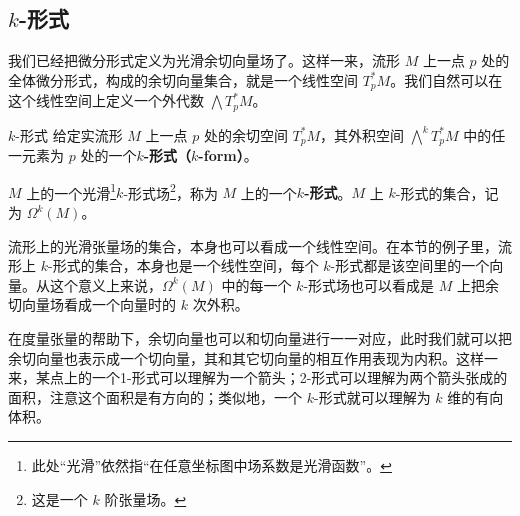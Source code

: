\subsection{$k$-形式}

我们已经把微分形式定义为光滑余切向量场了。这样一来，流形 $M$ 上一点 $p$ 处的全体微分形式，构成的余切向量集合，就是一个线性空间 $T^*_pM$。我们自然可以在这个线性空间上定义一个外代数 $\bigwedge T^*_pM$。

\begin{definition}{$k$-形式}
给定实流形 $M$ 上一点 $p$ 处的余切空间 $T^*_pM$，其外积空间 $\bigwedge^kT^*_pM$ 中的任一元素为 $p$ 处的一个\textbf{$k$-形式（$k$-form）}。

$M$ 上的一个光滑\footnote{此处“光滑”依然指“在任意坐标图中场系数是光滑函数”。}$k$-形式场\footnote{这是一个 $k$ 阶张量场。}，称为 $M$ 上的一个\textbf{$k$-形式}。$M$ 上 $k$-形式的集合，记为 $\Omega^k(M)$。
\end{definition}

流形上的光滑张量场的集合，本身也可以看成一个线性空间。在本节的例子里，流形上 $k$-形式的集合，本身也是一个线性空间，每个 $k$-形式都是该空间里的一个向量。从这个意义上来说，$\Omega^k({M})$ 中的每一个 $k$-形式场也可以看成是 $M$ 上把余切向量场看成一个向量时的 $k$ 次外积。

在度量张量的帮助下，余切向量也可以和切向量进行一一对应，此时我们就可以把余切向量也表示成一个切向量，其和其它切向量的相互作用表现为内积。这样一来，某点上的一个1-形式可以理解为一个箭头；2-形式可以理解为两个箭头张成的面积，注意这个面积是有方向的；类似地，一个 $k$-形式就可以理解为 $k$ 维的有向体积。








